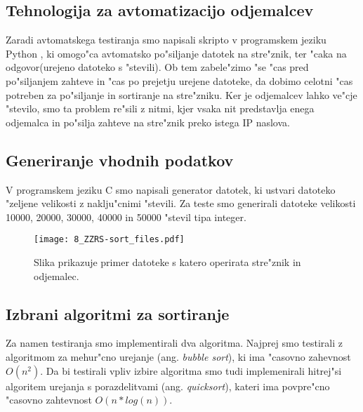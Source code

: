 \subsection{Tehnologija za avtomatizacijo odjemalcev}
Zaradi avtomatskega testiranja smo napisali skripto v programskem jeziku Python \cite{8_py}, ki omogo"ca avtomatsko po"siljanje datotek na stre"znik, ter "caka na odgovor(urejeno datoteko s "stevili). Ob tem zabele"zimo "se "cas pred po"siljanjem zahteve in "cas po prejetju urejene datoteke, da dobimo celotni "cas potreben za po"siljanje in sortiranje na stre"zniku. Ker je odjemalcev lahko ve"cje "stevilo, smo ta problem re"sili z nitmi, kjer vsaka nit predstavlja enega odjemalca in po"silja zahteve na stre"znik preko istega IP naslova.

\subsection{Generiranje vhodnih podatkov}
V programskem jeziku C smo napisali generator datotek, ki ustvari datoteko "zeljene velikosti z naklju"cnimi "stevili. Za teste smo generirali datoteke velikosti 10000, 20000, 30000, 40000 in 50000 "stevil tipa integer.

\begin{figure} [!h]
  \centering
    \texttt{[image: 8\_ZZRS-sort\_files.pdf]}
  \caption{Slika prikazuje primer datoteke s katero operirata stre"znik in odjemalec.}
  \label{8_files}
\end{figure}

\subsection{Izbrani algoritmi za sortiranje}
\label{8_izbira_algoritmov}
Za namen testiranja smo implementirali dva algoritma. Najprej smo testirali z algoritmom za mehur"cno urejanje (ang. \textit{bubble sort}), ki ima "casovno zahevnost $O(n^2)$.
Da bi testirali vpliv izbire algoritma smo tudi implemenirali hitrej"si algoritem urejanja s porazdelitvami (ang. \textit{quicksort}), kateri ima povpre"cno "casovno zahtevnost $O(n* log(n))$.



